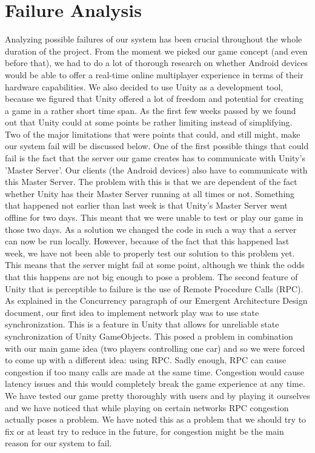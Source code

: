 \documentclass[11pt,twoside,a4paper]{article}
\begin{document}
\section*{Failure Analysis}
Analyzing possible failures of our system has been crucial throughout the whole duration of the project. From the moment we picked our game concept (and even before that), we had to do a lot of thorough research on whether Android devices would be able to offer a real-time online multiplayer experience in terms of their hardware capabilities.\newline
We also decided to use Unity as a development tool, because we figured that Unity offered a lot of freedom and potential for creating a game in a rather short time span. As the first few weeks passed by we found out that Unity could at some points be rather limiting instead of simplifying. Two of the major limitations that were points that could, and still might, make our system fail will be discussed below.
\newline
\newline
One of the first possible things that could fail is the fact that the server our game creates has to communicate with Unity's 'Master Server'. Our clients (the Android devices) also have to communicate with this Master Server. The problem with this is that we are dependent of the fact whether Unity has their Master Server running at all times or not. Something that happened not earlier than last week is that Unity's Master Server went offline for two days. This meant that we were unable to test or play our game in those two days. As a solution we changed the code in such a way that a server can now be run locally. However, because of the fact that this happened last week, we have not been able to properly test our solution to this problem yet. This means that the server might fail at some point, although we think the odds that this happens are not big enough to pose a problem.
\newline
\newline
The second feature of Unity that is perceptible to failure is the use of Remote Procedure Calls (RPC). As explained in the Concurrency paragraph of our Emergent Architecture Design document, our first idea to implement network play was to use state synchronization. This is a feature in Unity that allows for unreliable state synchronization of Unity GameObjects. This posed a problem in combination with our main game idea (two players controlling one car) and so we were forced to come up with a different idea: using RPC. Sadly enough, RPC can cause congestion if too many calls are made at the same time. Congestion would cause latency issues and this would completely break the game experience at any time. We have tested our game pretty thoroughly with users and by playing it ourselves and we have noticed that while playing on certain networks RPC congestion actually poses a problem. We have noted this as a problem that we should try to fix or at least try to reduce in the future, for congestion might be the main reason for our system to fail.
\end{document}
